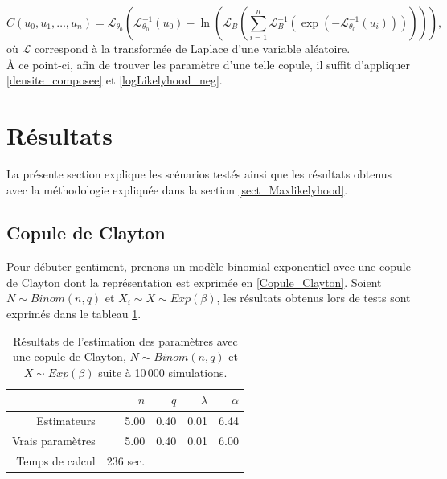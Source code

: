 \documentclass{article}
\begin{document}
	\begin{equation}
	C(u_0, u_1, \dots, u_n) =
		\mathscr{L}_{\theta_0} \left(
			\mathscr{L}_{\theta_0}^{-1}(u_0) - \ln \left( 
				\mathscr{L}_B  \left(
					\sum_{i=1}^{n} \mathscr{L}_{B}^{-1} \left(
					 \exp \left(
					  - \mathscr{L}_{\theta_0}^{-1}(u_i) 
					  \right) \right)\right)\right)\right),
	\end{equation}
	où $\mathscr{L}$ correspond à la transformée de Laplace d'une variable aléatoire.\\
	
	À ce point-ci, afin de trouver les paramètre d'une telle copule, il suffit d'appliquer \eqref{densite_composee} et \eqref{logLikelyhood_neg}.
	
	\section{Résultats}
	La présente section explique les scénarios testés ainsi que les résultats obtenus avec la méthodologie expliquée dans la section \ref{sect_Maxlikelyhood}.
	
	\subsection{Copule de Clayton}
	Pour débuter gentiment, prenons un modèle binomial-exponentiel avec une copule de Clayton dont la représentation est exprimée en \eqref{Copule_Clayton}.
	Soient $N \sim Binom(n,q)$ et $X_i \sim X \sim Exp(\beta)$, les résultats obtenus lors de tests sont exprimés dans le tableau \ref{tbl_Clayton_Binom}.
	
	\begin{table}[H]
		\centering
		\begin{tabular}{rrrrr}
			\hline
			& $n$ & $q$ & $\lambda$ & $\alpha$ \\ 
			\hline
			Estimateurs & 5.00 & 0.40 & 0.01 & 6.44 \\ 
			Vrais paramètres & 5.00 & 0.40 & 0.01 & 6.00 \\ 
			\hline
			Temps de calcul & 236 sec.\\
			\hline
		\end{tabular}
		\renewcommand{\tablename}{Tableau}
		\caption[Estimations avec une copule de Clayton et $N\sim Binomiale$]{Résultats de l'estimation des paramètres avec une copule de Clayton, $N\sim Binom(n,q)$ et $X \sim Exp(\beta)$ suite à 10\,000 simulations.} \label{tbl_Clayton_Binom}
	\end{table}
	
\end{document}
